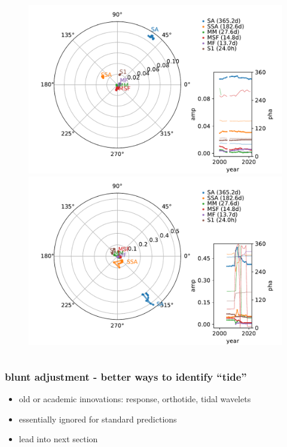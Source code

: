 \begin{frame}
\begin{columns}
    \begin{column}{0.5\textwidth}
      \begin{figure}      
        \includegraphics[height=0.4\textheight]{figures/plots/complex_62290.pdf}
        \includegraphics[height=0.4\textheight]{figures/plots/complex_63540.pdf}
      \end{figure}
    \end{column}
\end{columns}

\end{frame}
\begin{frame}
\frametitle{blunt adjustment - better ways to identify ``tide''}
\begin{itemize}
    \item old or academic innovations: response, orthotide, tidal wavelets
    \item essentially ignored for standard predictions
    \item lead into next section
\end{itemize} 
\end{frame}
